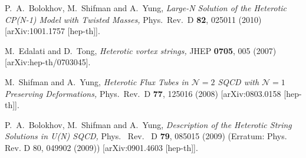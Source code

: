 \documentclass[epsfig,12pt]{article}
\begin{document}
\begin{thebibliography}{99}
P.~A.~Bolokhov, M.~Shifman and A.~Yung,
{\em Large-N Solution of the Heterotic CP(N-1) Model with Twisted Masses,}
  Phys.\ Rev.\ D {\bf 82}, 025011 (2010)
  [arXiv:1001.1757 [hep-th]].

 M.~Edalati and D.~Tong,
 {\em Heterotic vortex strings,}
  JHEP {\bf 0705}, 005 (2007)
  [arXiv:hep-th/0703045].
  
  M.~Shifman and A.~Yung,
{\em Heterotic Flux Tubes in ${\mathcal N}=2$ SQCD with ${\mathcal N}=1$ Preserving Deformations,}
  Phys.\ Rev.\  D {\bf 77}, 125016 (2008)
  [arXiv:0803.0158 [hep-th]].

  P.~A.~Bolokhov, M.~Shifman and A.~Yung,
{\em Description of the Heterotic String Solutions in U(N) SQCD,}
  Phys. \ Rev. \ D {\bf 79}, 085015 (2009) (Erratum: Phys. Rev. D 80, 049902 (2009))
  [arXiv:0901.4603 [hep-th]].

\end{thebibliography}
\end{document}
